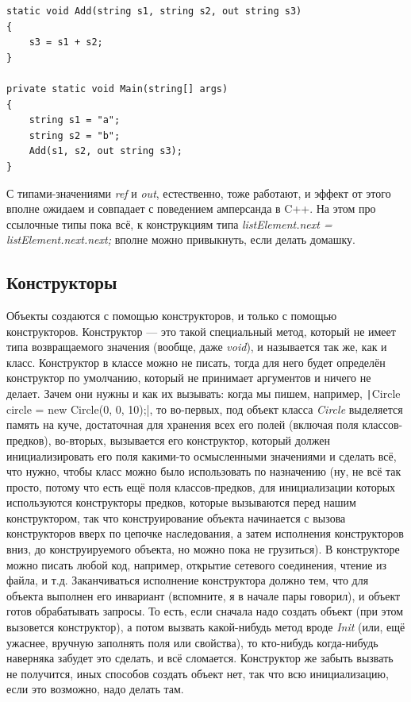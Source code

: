 \documentclass[a5paper]{article}
\begin{document}
\begin{verbatim}
static void Add(string s1, string s2, out string s3)
{
    s3 = s1 + s2;
}

private static void Main(string[] args)
{
    string s1 = "a";
    string s2 = "b";
    Add(s1, s2, out string s3);
}
\end{verbatim}

С типами-значениями \textit{ref} и \textit{out}, естественно, тоже работают, и эффект от этого вполне ожидаем и совпадает с поведением амперсанда в C++. На этом про ссылочные типы пока всё, к конструкциям типа \textit{listElement.next = listElement.next.next;} вполне можно привыкнуть, если делать домашку.

\subsection{Конструкторы}

Объекты создаются с помощью конструкторов, и только с помощью конструкторов. Конструктор --- это такой специальный метод, который не имеет типа возвращаемого значения (вообще, даже \textit{void}), и называется так же, как и класс. Конструктор в классе можно не писать, тогда для него будет определён конструктор по умолчанию, который не принимает аргументов и ничего не делает. Зачем они нужны и как их вызывать: когда мы пишем, например, \texttt|Circle circle = new Circle(0, 0, 10);|, то во-первых, под объект класса \textit{Circle} выделяется память на куче, достаточная для хранения всех его полей (включая поля классов-предков), во-вторых, вызывается его конструктор, который должен инициализировать его поля какими-то осмысленными значениями и сделать всё, что нужно, чтобы класс можно было использовать по назначению (ну, не всё так просто, потому что есть ещё поля классов-предков, для инициализации которых используются конструкторы предков, которые вызываются перед нашим конструктором, так что конструирование объекта начинается с вызова конструкторов вверх по цепочке наследования, а затем исполнения конструкторов вниз, до конструируемого объекта, но можно пока не грузиться). В конструкторе можно писать любой код, например, открытие сетевого соединения, чтение из файла, и т.д. Заканчиваться исполнение конструктора должно тем, что для объекта выполнен его инвариант (вспомните, я в начале пары говорил), и объект готов обрабатывать запросы. То есть, если сначала надо создать объект (при этом вызовется конструктор), а потом вызвать какой-нибудь метод вроде \textit{Init} (или, ещё ужаснее, вручную заполнять поля или свойства), то кто-нибудь когда-нибудь наверняка забудет это сделать, и всё сломается. Конструктор же забыть вызвать не получится, иных способов создать объект нет, так что всю инициализацию, если это возможно, надо делать там.
\end{document}
